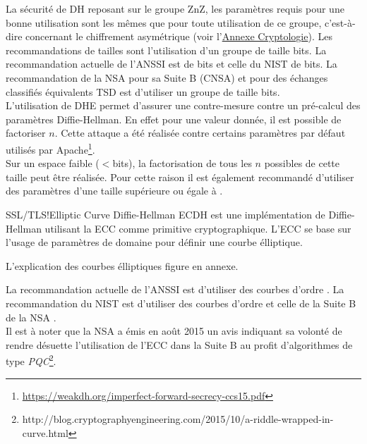 \documentclass[twoside,a4paper,12pt,titlepage]{book}
\begin{document}
La sécurité de \gls{DH} reposant sur le groupe \gls{ZnZ}, les paramètres requis pour une bonne utilisation sont les mêmes que pour toute utilisation de ce groupe, c'est-à-dire concernant le chiffrement asymétrique (voir l'\hyperref[analCrypto]{Annexe Cryptologie}). Les recommandations de tailles sont l'utilisation d'un groupe de taille \DHrecosize bits. La recommandation actuelle de l'\gls{ANSSI} est de \DHrecosizeAnssi bits et celle du \gls{NIST} de \DHrecosizeNIST bits. La recommandation de la NSA pour sa Suite B (CNSA) et pour des échanges classifiés équivalents TSD est d'utiliser un groupe de taille \DHrecosizeCNSA bits.\\
L'utilisation de \gls{DHE} permet d'assurer une contre-mesure contre un pré-calcul des paramètres Diffie-Hellman. En effet pour une valeur donnée, il est possible de factoriser $n$. Cette attaque a été réalisée contre certains paramètres par défaut utilisés par Apache\footnote{\url{https://weakdh.org/imperfect-forward-secrecy-ccs15.pdf}}.\\
Sur un espace faible ($<$\DHminsize bits), la factorisation de tous les $n$ possibles de cette taille peut être réalisée. Pour cette raison il est également recommandé d'utiliser des paramètres d'une taille supérieure ou égale à \DHrecosize.\\
\begin{Define}{SSL/TLS!Elliptic Curve Diffie-Hellman}
	\gls{ECDH} est une implémentation de Diffie-Hellman utilisant la \gls{ECC} comme primitive cryptographique. L'\gls{ECC} se base sur l'usage de paramètres de domaine pour définir une courbe élliptique.\\
\end{Define}
\begin{Warning}
L'explication des courbes élliptiques figure en annexe.
\end{Warning}

La recommandation actuelle de l'\gls{ANSSI} est d'utiliser des courbes d'ordre \ECDHrecosizeAnssi. La recommandation du \gls{NIST} est d'utiliser des courbes d'ordre \ECDHrecosizeNIST et celle de la Suite B de la \gls{NSA} \ECDHrecosizeCNSA.\\
Il est à noter que la \gls{NSA} a émis en août 2015 un avis indiquant sa volonté de rendre désuette l'utilisation de l'ECC dans la Suite B au profit d'algorithmes de type \textit{\gls{PQC}}\footnote{http://blog.cryptographyengineering.com/2015/10/a-riddle-wrapped-in-curve.html}.
\end{document}
